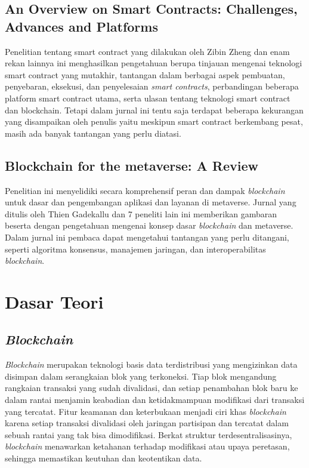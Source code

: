 \subsection{An Overview on Smart Contracts: Challenges, Advances and Platforms}
Penelitian tentang smart contract yang dilakukan oleh Zibin Zheng dan enam rekan lainnya ini menghasilkan pengetahuan berupa tinjauan mengenai teknologi smart contract yang mutakhir, tantangan dalam berbagai aspek pembuatan, penyebaran, eksekusi, dan penyelesaian \emph{smart contracts}, perbandingan beberapa platform smart contract utama, serta ulasan tentang teknologi smart contract dan blockchain. Tetapi dalam jurnal ini tentu saja terdapat beberapa kekurangan yang disampaikan oleh penulis yaitu meskipun smart contract berkembang pesat, masih ada banyak tantangan yang perlu diatasi.

\subsection{Blockchain for the metaverse: A Review}
Penelitian ini menyelidiki secara komprehensif peran dan dampak \emph{blockchain} untuk dasar dan pengembangan aplikasi dan layanan di metaverse. Jurnal yang ditulis oleh Thien Gadekallu dan 7 peneliti lain ini memberikan gambaran beserta dengan pengetahuan mengenai konsep dasar \emph{blockchain} dan metaverse. Dalam jurnal ini pembaca dapat mengetahui tantangan yang perlu ditangani, seperti algoritma konsensus, manajemen jaringan, dan interoperabilitas \emph{blockchain}. 

\section{Dasar Teori}

\subsection{\emph{Blockchain}}
\emph{Blockchain} merupakan teknologi basis data terdistribusi yang mengizinkan data disimpan dalam serangkaian blok yang terkoneksi. Tiap blok mengandung rangkaian transaksi yang sudah divalidasi, dan setiap penambahan blok baru ke dalam rantai menjamin keabadian dan ketidakmampuan modifikasi dari transaksi yang tercatat. Fitur keamanan dan keterbukaan menjadi ciri khas \emph{blockchain} karena setiap transaksi divalidasi oleh jaringan partisipan dan tercatat dalam sebuah rantai yang tak bisa dimodifikasi. Berkat struktur terdesentralisasinya, \emph{blockchain} menawarkan ketahanan terhadap modifikasi atau upaya peretasan, sehingga memastikan keutuhan dan keotentikan data. \cite{Tjokrosetio22}


